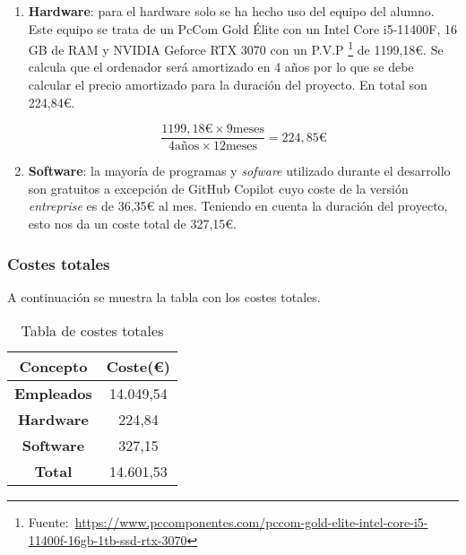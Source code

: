 \begin{enumerate}
Por otro lado el \textit{product owner}, suponiendo un sueldo bruto anual de 39000€\footnote{Fuente:~\url{https://www.glassdoor.es/Sueldos/product-owner-sueldo-SRCH_KO0,13.htm}} , se calcula que el salario bruto hora es de 
21,43€. Teniendo en cuenta que el tutor ha dedicado entorno a 3 horas por semana al proyecto, cobraría 257,16€ brutos al mes. Aplicando la formula al igual que para el desarrollador:
\begin{equation}
\frac{257,16\frac{\text{€}}{mes}}{\text{(1 - (0.236 + 0.067 + 0.002 + 0.006 + 0.015))}} = \text{381,54} \frac{\text{€}}{mes}
\end{equation}
Por lo tanto, y teniendo en cuenta que la duración del proyecto ha sido de 9 meses, el total que ha de pagar la empresa es de 14.049,54€ por los empleados.

\[
381.54\frac{\text{€}}{\text{mes}} \times 9\,\text{meses} + 1179.52\frac{\text{€}}{\text{mes}} \times 9\,\text{meses} = 14049.54\,\text{€}
\]


\item \textbf{Hardware}: para el hardware solo se ha hecho uso del equipo del alumno. Este equipo se trata de un PcCom Gold Élite con un Intel Core i5-11400F, 16 GB de RAM y NVIDIA Geforce RTX 3070 con un P.V.P \footnote{Fuente:~\url{https://www.pccomponentes.com/pccom-gold-elite-intel-core-i5-11400f-16gb-1tb-ssd-rtx-3070}} de 1199,18€. Se calcula que el ordenador será amortizado en 4 años por lo que se debe calcular el precio amortizado para la duración del proyecto. En total son 224,84€.

\[
\frac{1199,18\text{€}\times 9 \text{meses}}{4 \text{años} \times 12 \text{meses}}= 224,85\text{€}
\]

\item \textbf{Software}: la mayoría de programas y \textit{sofware} utilizado durante el desarrollo son gratuitos a excepción de GitHub Copilot cuyo coste de la versión \textit{entreprise} es de 36,35€ al mes. Teniendo en cuenta la duración del proyecto, esto nos da un coste total de 327,15€.

\end{enumerate}

\subsubsection{Costes totales}
A continuación se muestra la tabla con los costes totales.
\begin{table}[ht]
\begin{center}
\begin{tabular}{| c | c |}
	\hline
	\textbf{Concepto} & \textbf{Coste(€)} \\ \hline
	\textbf{Empleados} & 14.049,54 \\
	\textbf{Hardware} & 224,84 \\
	\textbf{Software} & 327,15 \\ \hline
	\hline
	\textbf{Total} & 14.601,53 \\
	\hline
\end{tabular}
\caption{Tabla de costes totales}
\end{center}
\end{table}

